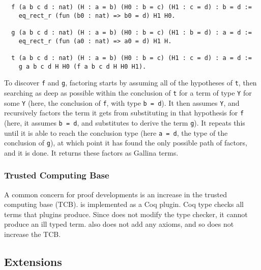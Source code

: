 \begin{lstlisting}
  f (a b c d : nat) (H : a = b) (H0 : b = c) (H1 : c = d) : b = d :=
    eq_rect_r (fun (b0 : nat) => b0 = d) H1 H0.

  g (a b c d : nat) (H : a = b) (H0 : b = c) (H1 : b = d) : a = d :=
    eq_rect_r (fun (a0 : nat) => a0 = d) H1 H.

  t (a b c d : nat) (H : a = b) (H0 : b = c) (H1 : c = d) : a = d :=
    g a b c d H H0 (f a b c d H H0 H1).
\end{lstlisting}
To discover \lstinline{f} and \lstinline{g},
factoring starts by assuming all of the hypotheses of \lstinline{t},
then searching as deep as possible within the conclusion of \lstinline{t} for a term
of type \lstinline{Y} for some \lstinline{Y} (here, the conclusion of \lstinline{f}, with type \lstinline{b = d}).
It then assumes \lstinline{Y}, and recursively factors the term
it gets from substituting in that hypothesis for \lstinline{f} (here, it assumes \lstinline{b = d}, and substitutes to derive the term \lstinline{g}).
It repeats this until it is able to reach the conclusion type (here \lstinline{a = d}, the type of the conclusion of \lstinline{g}),
at which point it has found the only possible path of factors, and it is done.
It returns these factors as Gallina terms.

\subsubsection{Trusted Computing Base}
\label{sec:tcb}

A common concern for proof developments is an increase in the trusted computing base (TCB). %
\sysname is implemented as a Coq plugin.
Coq type checks all terms that plugins produce.
Since \sysname does not modify the type checker, it cannot produce an ill typed term.
\sysname also does not add any axioms,
and so does not increase the TCB. %

\subsection{Extensions}
\label{sec:workflow}

